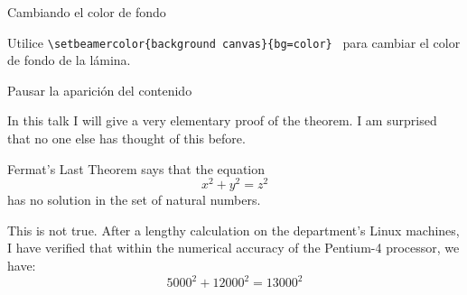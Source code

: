 \documentclass{beamer}
\begin{document}

{
\begin{frame}{Cambiando el color de fondo}
 
 Utilice {\tt \textbackslash setbeamercolor\{background canvas\}\{bg=color\} } para cambiar el color de fondo de la lámina.
 
\end{frame}
}



\begin{frame}{Pausar la aparición del contenido} 
 
In this talk I will give a very elementary proof of the 
theorem.  I am surprised that no one else has thought of 
this before. 
\medskip %
 
\pause 
 
Fermat's Last Theorem says that the equation 
\[ 
  x^2 + y^2 = z^2 
\] 
has no solution in the set of natural numbers. 
\medskip 
 
\pause 
 
This is not true.  After a lengthy calculation on the 
department's Linux machines, I have verified that within 
the numerical accuracy of the Pentium-4 processor, we have: 
\[ 
  5000^2 + 12000^2 = 13000^2 
\] 
 
\end{frame} 


\end{document}
